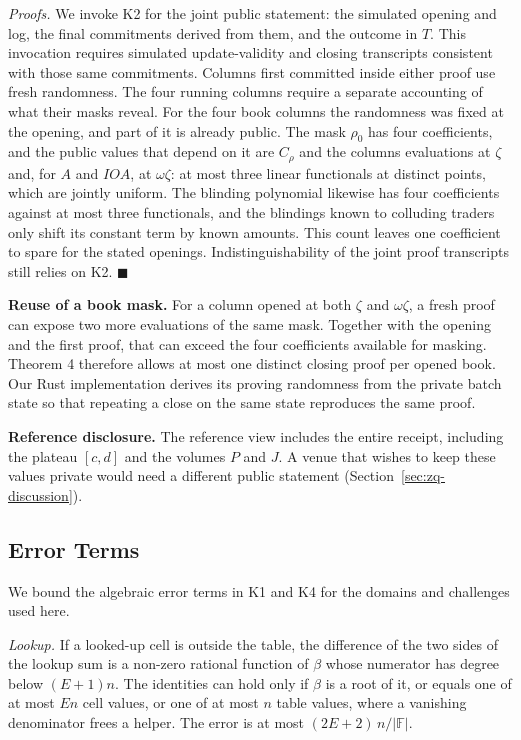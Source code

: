 \emph{Proofs.} We invoke K2 for the joint public statement: the simulated opening and log, the final commitments derived from them, and the outcome in \(T\). This invocation requires simulated update-validity and closing transcripts consistent with those same commitments. Columns first committed inside either proof use fresh randomness. The four running columns require a separate accounting of what their masks reveal. For the four book columns the randomness was fixed at the opening, and part of it is already public. The mask \(\rho_0\) has four coefficients, and the public values that depend on it are \(C_\rho\) and the column\textquotesingle s evaluations at \(\zeta\) and, for \(A\) and \(IOA\), at \(\omega\zeta\): at most three linear functionals at distinct points, which are jointly uniform. The blinding polynomial likewise has four coefficients against at most three functionals, and the blindings known to colluding traders only shift its constant term by known amounts. This count leaves one coefficient to spare for the stated openings. Indistinguishability of the joint proof transcripts still relies on K2. \(\blacksquare\)

\textbf{Reuse of a book mask.} For a column opened at both \(\zeta\) and \(\omega\zeta\), a fresh proof can expose two more evaluations of the same mask. Together with the opening and the first proof, that can exceed the four coefficients available for masking. Theorem 4 therefore allows at most one distinct closing proof per opened book. Our Rust implementation derives its proving randomness from the private batch state so that repeating a close on the same state reproduces the same proof.

\textbf{Reference disclosure.} The reference view includes the entire receipt, including the plateau \([c,d]\) and the volumes \(P\) and \(J\). A venue that wishes to keep these values private would need a different public statement (Section~\ref{sec:zq-discussion}).

\subsection{Error Terms}
\label{app:zq-security-errors}

We bound the algebraic error terms in K1 and K4 for the domains and challenges used here.

\emph{Lookup.} If a looked-up cell is outside the table, the difference of the two sides of the lookup sum is a non-zero rational function of \(\beta\) whose numerator has degree below \((E+1)n\). The identities can hold only if \(\beta\) is a root of it, or equals one of at most \(En\) cell values, or one of at most \(n\) table values, where a vanishing denominator frees a helper. The error is at most \((2E+2)\,n/|\mathbb{F}|\).

